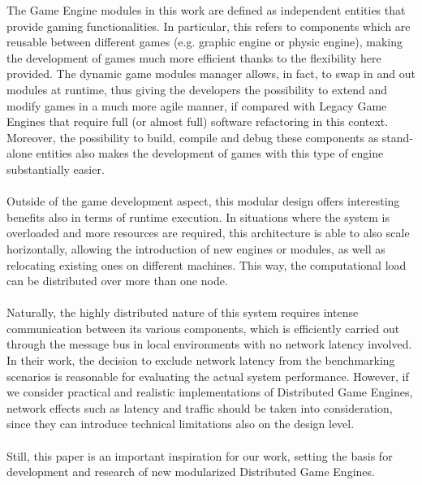 The Game Engine modules in this work are defined as independent entities that provide gaming functionalities. In particular, this refers to components which are reusable between different games (e.g. graphic engine or physic engine), making the development of games much more efficient thanks to the flexibility here provided. The dynamic game modules manager allows, in fact, to swap in and out modules at runtime, thus giving the developers the possibility to extend and modify games in a much more agile manner, if compared with Legacy Game Engines that require full (or almost full) software refactoring in this context. \\
Moreover, the possibility to build, compile and debug these components as stand-alone entities also makes the development of games with this type of engine substantially easier. \\ \\
Outside of the game development aspect, this modular design offers interesting benefits also in terms of runtime execution. In situations where the system is overloaded and more resources are required, this architecture is able to also scale horizontally, allowing the introduction of new engines or modules, as well as relocating existing ones on different machines. This way, the computational load can be distributed over more than one node. \\ \\
Naturally, the highly distributed nature of this system requires intense communication between its various components, which is efficiently carried out through the message bus in local environments with no network latency involved. In their work, the decision to exclude network latency from the benchmarking scenarios is reasonable for evaluating the actual system performance. However, if we consider practical and realistic implementations of Distributed Game Engines, network effects such as latency and traffic should be taken into consideration, since they can introduce technical limitations also on the design level. \\ \\
Still, this paper is an important inspiration for our work, setting the basis for development and research of new modularized Distributed Game Engines.


